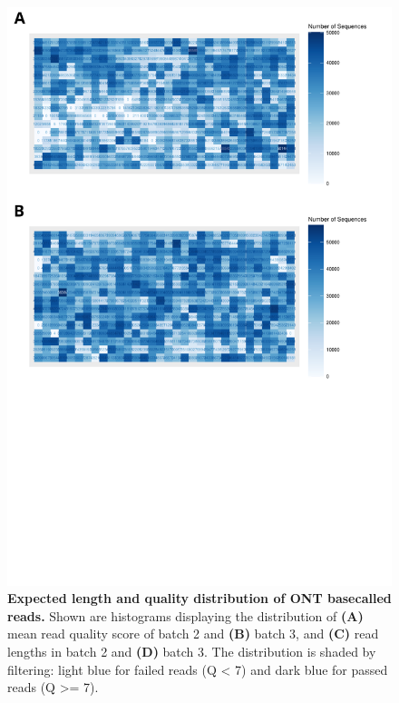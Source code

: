 \begin{figure}[]
	\begin{center}
		\includegraphics[page=3,trim={0 0cm 0cm 11cm},clip, scale = 0.45]{Figures/ONTTargetedTranscriptome.pdf}
	\end{center}
	\captionsetup{width=0.95\textwidth}
	\caption[ONT run performance metrics from targeted profiling of rTg4510 mice]%
	{\textbf{Expected length and quality distribution of ONT basecalled reads.} Shown are histograms displaying the distribution of \textbf{(A)} mean read quality score of batch 2 and \textbf{(B)} batch 3, and \textbf{(C)} read lengths in batch 2 and \textbf{(D)} batch 3. The distribution is shaded by filtering: light blue for failed reads (Q < 7) and dark blue for passed reads (Q >= 7).}
	\label{fig:ont_targetedlengthquality}
\end{figure}

